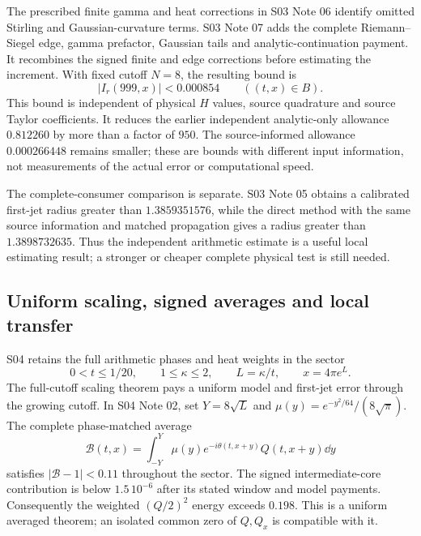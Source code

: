 The prescribed finite gamma and heat corrections in
{S03 Note 06} identify omitted Stirling and Gaussian-curvature terms.
{S03 Note 07} adds the complete Riemann--Siegel edge, gamma prefactor,
Gaussian tails and analytic-continuation payment. It recombines the signed
finite and edge corrections before estimating the increment. With fixed
cutoff $N=8$, the resulting bound is
\[
 |I_r(999,x)|<0.000854\qquad ((t,x)\in B).
\]
This bound is independent of physical $H$ values, source quadrature and
source Taylor coefficients. It reduces the earlier independent
analytic-only allowance $0.812260$ by more than a factor of $950$.
The source-informed allowance $0.000266448$ remains smaller; these are
bounds with different input information, not measurements of the actual
error or computational speed.

The complete-consumer comparison is separate.
{S03 Note 05} obtains a calibrated first-jet radius greater than
$1.3859351576$, while the direct method with the same source information
and matched propagation gives a radius greater than $1.3898732635$.
Thus the independent arithmetic estimate is a useful local estimating
result; a stronger or cheaper complete physical test is still needed.

\subsection{Uniform scaling, signed averages and local transfer}

S04 retains the full arithmetic phases and heat weights in the sector
\[
 0<t\le1/20,\qquad 1\le\kappa\le2,\qquad
 L=\kappa/t,\qquad x=4\pi e^L.
\]
The 
{full-cutoff scaling theorem} pays a uniform model and first-jet error
through the growing cutoff. In
{S04 Note 02}, set $Y=8\sqrt L$ and
$\mu(y)=e^{-y^2/64}/(8\sqrt\pi)$. The complete phase-matched average
\[
 \mathcal B(t,x)=\int_{-Y}^{Y}\mu(y)e^{-i\theta(t,x+y)}
                  Q(t,x+y)\dd y
\]
satisfies $|\mathcal B-1|<0.11$ throughout the sector. The signed
intermediate-core contribution is below $1.5\,10^{-6}$ after its stated
window and model payments. Consequently the weighted $(Q/2)^2$ energy
exceeds $0.198$. This is a uniform averaged theorem; an isolated common
zero of $Q,Q_x$ is compatible with it.

